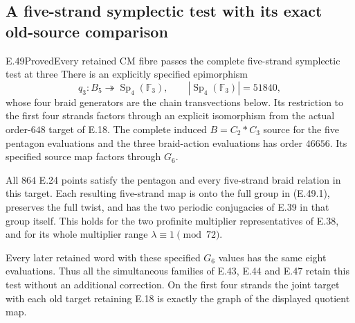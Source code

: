 \subsection{A five-strand symplectic test with its exact old-source comparison}

\begin{statement}{E.49}{Proved}{Every retained CM fibre passes the complete five-strand symplectic test at three}
There is an explicitly specified epimorphism
\[
 q_3:B_5\twoheadrightarrow\operatorname{Sp}_4(\mathbb F_3),
 \qquad |\operatorname{Sp}_4(\mathbb F_3)|=51840,
 \tag{E.49.1}
\]
whose four braid generators are the chain transvections below.
Its restriction to the first four strands factors through an
explicit isomorphism from the actual order-$648$ target of E.18.
The complete induced $B=C_2*C_3$ source for the five pentagon
evaluations and the three braid-action evaluations has order
$46656$.  Its specified source map factors through $G_6$.

All $864$ E.24 points satisfy the pentagon and every five-strand
braid relation in this target.  Each resulting five-strand map
is onto the full group in \textup{(E.49.1)}, preserves the full
twist, and has the two periodic conjugacies of E.39 in that group
itself.  This holds for the two profinite multiplier representatives
of E.38, and for its whole multiplier range
$\lambda\equiv1\pmod{72}$.

Every later retained word with these specified $G_6$ values has
the same eight evaluations.  Thus all the simultaneous families
of E.43, E.44 and E.47 retain this test without an additional
correction.  On the first four strands the joint target with
each old target retaining E.18 is exactly the graph of the
displayed quotient map.
\end{statement}

